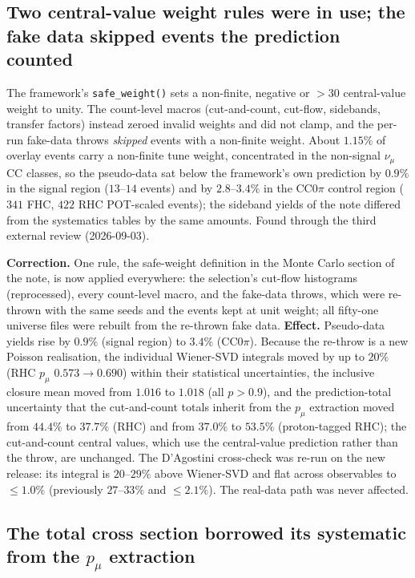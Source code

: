 \subsection{Two central-value weight rules were in use; the fake data skipped events the prediction counted}

The framework's \texttt{safe\_weight()} sets a non-finite, negative or $>30$ central-value
weight to unity. The count-level macros (cut-and-count, cut-flow, sidebands, transfer
factors) instead zeroed invalid weights and did not clamp, and the per-run fake-data throws
\emph{skipped} events with a non-finite weight. About $1.15\%$ of overlay events carry a
non-finite tune weight, concentrated in the non-signal $\nu_\mu$CC classes, so the
pseudo-data sat below the framework's own prediction by $0.9\%$ in the signal region
($13$--$14$ events) and by $2.8$--$3.4\%$ in the CC$0\pi$ control region ($341$ FHC,
$422$ RHC POT-scaled events); the sideband yields of the note differed from the
systematics tables by the same amounts. Found through the third external review
(2026-09-03).

\textbf{Correction.} One rule, the safe-weight definition in the Monte Carlo section of the note, is now applied
everywhere: the selection's cut-flow histograms (reprocessed), every count-level macro,
and the fake-data throws, which were re-thrown with the same seeds and the events kept at
unit weight; all fifty-one universe files were rebuilt from the re-thrown fake data.
\textbf{Effect.} Pseudo-data yields rise by $0.9\%$ (signal region) to $3.4\%$ (CC$0\pi$).
Because the re-throw is a new Poisson realisation, the individual Wiener-SVD integrals
moved by up to $20\%$ (RHC $p_\mu$ $0.573\to0.690$) within their statistical
uncertainties, the inclusive closure mean moved from $1.016$ to $1.018$ (all $p>0.9$), and
the prediction-total uncertainty that the cut-and-count totals inherit from the $p_\mu$
extraction moved from $44.4\%$ to $37.7\%$ (RHC) and from $37.0\%$ to $53.5\%$
(proton-tagged RHC); the cut-and-count central values, which use the central-value
prediction rather than the throw, are unchanged. The D'Agostini cross-check was re-run on
the new release: its integral is $20$--$29\%$ above Wiener-SVD and flat across observables
to $\le1.0\%$ (previously $27$--$33\%$ and $\le2.1\%$). The real-data path was never affected.

\subsection{The total cross section borrowed its systematic from the $p_\mu$ extraction}

